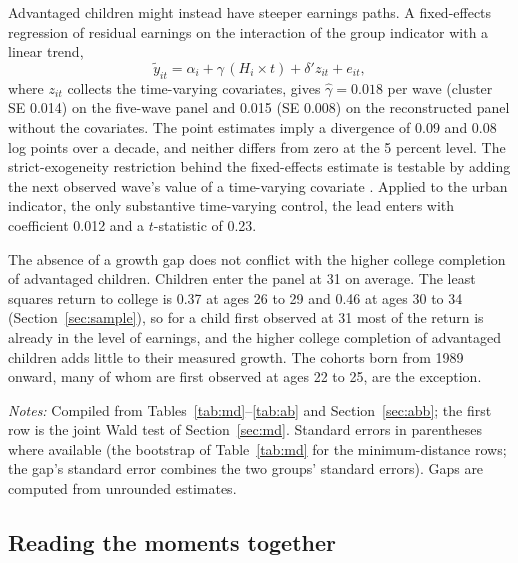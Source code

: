 \documentclass[11pt]{article}
\begin{document}
Advantaged children might instead have steeper earnings paths. A fixed-effects regression of residual earnings on the interaction of the group indicator with a linear trend,
\begin{equation}
\tilde y_{it} = \alpha_i + \gamma\,(H_i \times t) + \delta' z_{it} + e_{it},
\label{eq:fe}
\end{equation}
where $z_{it}$ collects the time-varying covariates, gives $\hat\gamma = 0.018$ per wave (cluster SE 0.014) on the five-wave panel and 0.015 (SE 0.008) on the reconstructed panel without the covariates. The point estimates imply a divergence of 0.09 and 0.08 log points over a decade, and neither differs from zero at the 5 percent level. The strict-exogeneity restriction behind the fixed-effects
estimate is testable by adding the next observed wave's value of a
time-varying covariate \citep[Section~10.7.1]{Wooldridge2010}. Applied to
the urban indicator, the only substantive time-varying control, the
lead enters with coefficient 0.012 and a $t$-statistic of 0.23.

The absence of a growth gap does not conflict with the higher college completion of advantaged children. Children enter the panel at 31 on average. The least squares return to college is 0.37 at ages 26 to 29 and 0.46 at ages 30 to 34 (Section~\ref{sec:sample}), so for a child first observed at 31 most of the return is already in
the level of earnings, and the higher college completion of advantaged
children adds little to their measured growth. The cohorts born from
1989 onward, many of whom are first observed at ages 22 to 25, are the
exception.

\begin{table}[t]
\centering
\small
\caption{Group comparison across process moments.}
\label{tab:summary}

\par\smallskip
\begin{minipage}{0.92\textwidth}
\footnotesize\emph{Notes:} Compiled from Tables~\ref{tab:md}--\ref{tab:ab} and Section~\ref{sec:abb}; the first row is the joint Wald test of Section~\ref{sec:md}. Standard errors in parentheses where available (the bootstrap of Table~\ref{tab:md} for the minimum-distance rows; the gap's standard error combines the two groups' standard errors). Gaps are computed from unrounded estimates.
\end{minipage}
\end{table}

\subsection{Reading the moments together}
\label{sec:together}
\end{document}
